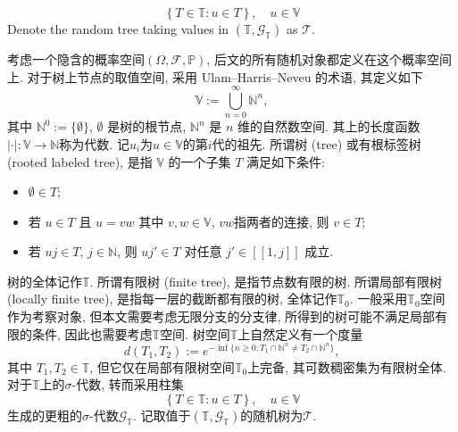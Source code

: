 {\begin{equation*}
        \left\{
            T\in\mathbb T: u\in T
        \right\},\quad u\in\mathbb V
    \end{equation*}
    Denote the random tree taking values in $(\mathbb T,\mathcal G_{\mathbb T})$ as $\mathcal T$.
}{
    考虑一个隐含的概率空间$(\Omega,\mathcal F,\mathbb P)$, 后文的所有随机对象都定义在这个概率空间上. 对于树上节点的取值空间, 采用 Ulam--Harris--Neveu  的术语, 其定义如下
    \begin{equation*}
        \mathbb V:=\bigcup_{n=0}^\infty\mathbb N^n,
    \end{equation*}
    其中 $\mathbb N^0:=\{\emptyset\}$, $\emptyset$ 是树的根节点, $\mathbb N^n$ 是 $n$ 维的自然数空间. 其上的长度函数$|\cdot|:\mathbb V\to\mathbb N$称为代数. 记$u_i$为$u\in\mathbb V$的第$i$代的祖先. 所谓{\kaishu 树} (tree) 或{\kaishu 有根标签树} (rooted labeled tree), 是指 $\mathbb V$ 的一个子集 $T$ 满足如下条件:
    \begin{itemize}
        \item $\emptyset\in T$;
        \item 若 $u\in T$ 且 $u=vw$ 其中 $v,w\in\mathbb V$, $vw$指两者的连接, 则 $v\in T$;
        \item 若 $uj\in T$, $j\in\mathbb N$, 则 $uj'\in T$ 对任意 $j'\in[\![1,j]\!]$ 成立.
    \end{itemize}
    树的全体记作$\mathbb T$. 所谓{\kaishu 有限树} (finite tree), 是指节点数有限的树. 所谓{\kaishu 局部有限树} (locally finite tree), 是指每一层的截断都有限的树, 全体记作$\mathbb T_0$. 一般采用$\mathbb T_0$空间作为考察对象, 但本文需要考虑无限分支的分支律, 所得到的树可能不满足局部有限的条件, 因此也需要考虑$\mathbb T$空间. 树空间$\mathbb T$上自然定义有一个度量
    \begin{equation*}
        d(T_1,T_2):=e^{-\inf\{n\ge 0:T_1\cap\mathbb N^n\neq T_2\cap\mathbb N^n\}},
    \end{equation*}
    其中 $T_1,T_2\in\mathbb T$, 但它仅在局部有限树空间$\mathbb T_0$上完备, 其可数稠密集为有限树全体. 对于$\mathbb T$上的$\sigma$-代数, 转而采用柱集
    \begin{equation*}
        \left\{
            T\in\mathbb T: u\in T
        \right\},\quad u\in\mathbb V
    \end{equation*}
    生成的更粗的$\sigma$-代数$\mathcal G_{\mathbb T}$. 记取值于$(\mathbb T,\mathcal G_{\mathbb T})$的随机树为$\mathcal T$.
}

